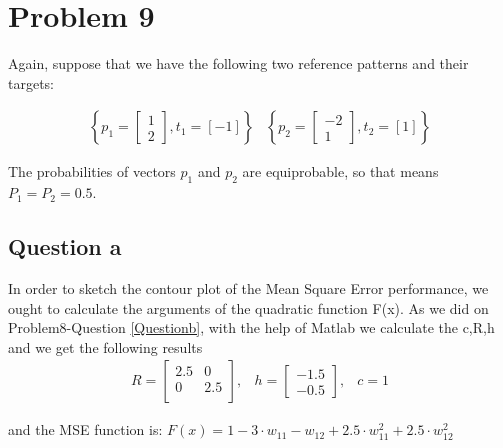 

\section{Problem 9}
Again, suppose that we have the following two reference patterns and their targets:
\vspace{5mm}

\[
\begin{array}{ccc}
	\left\{ 
	p_1 = \left[
	\begin{array}{c}
		1 \\
		2
	\end{array}
	\right], t_1 = \left[-1\right]
	\right\} & 
	\left\{ 
	p_2 = \left[
	\begin{array}{c}
		-2 \\
		1
	\end{array}
	\right], t_2 = \left[1\right]
	\right\}
\end{array}
\]
\vspace{5mm}

The probabilities of vectors $p_1$ and $p_2$ are equiprobable, so that means $P_1 = P_2 = 0.5$.

\subsection{Question a}
In order to sketch the contour plot of the Mean Square Error performance, we ought to calculate the arguments of the quadratic function F(x). As we did on Problem8-Question \ref{Questionb}, with the help of Matlab we calculate the c,R,h and we get the following results\\
\[
\begin{array}{ccc}
R = \left[
\begin{array}{cc}
	2.5 & 0 \\
	0 & 2.5 \\
\end{array}
\right], & 
h = \left[
\begin{array}{c}
	-1.5 \\
	-0.5
\end{array}
\right], & c = 1
\end{array}
\]

and the MSE function is:
$F(x) = 1 - 3 \cdot w_{11} -w_{12} + 2.5 \cdot w_{11}^2 + 2.5 \cdot w_{12}^2$ \\

